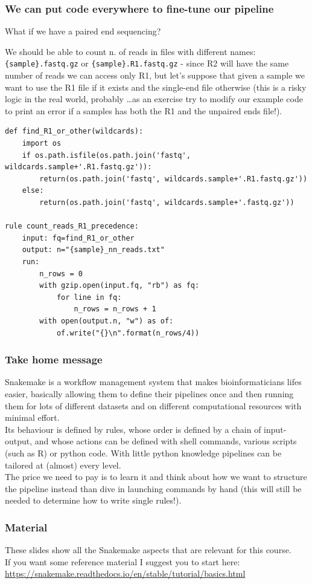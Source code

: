 \documentclass[xcolor=table]{beamer}
\begin{document}
\begin{frame}
\frametitle{We can put code everywhere to fine-tune our pipeline}
What if we have a paired end sequencing?

We should be able to count n. of reads in \textcolor{beer}{files with different names}:
\texttt{\{sample\}.fastq.gz} or \texttt{\{sample\}.R1.fastq.gz} - since R2 will have the same
number of reads we can access only R1, but let's suppose that given a sample we want to use the R1 file
if it exists and the single-end file otherwise (this is a risky logic in the real world, probably \ldots as an 
exercise try to modify our example code to print an error if a samples has both the R1 and the unpaired ends file!).

\end{frame}


\begin{frame}[fragile]
\begin{lstlisting}[basicstyle=\tiny]
def find_R1_or_other(wildcards):
    import os
    if os.path.isfile(os.path.join('fastq', wildcards.sample+'.R1.fastq.gz')):
        return(os.path.join('fastq', wildcards.sample+'.R1.fastq.gz'))
    else:
        return(os.path.join('fastq', wildcards.sample+'.fastq.gz'))

rule count_reads_R1_precedence:
    input: fq=find_R1_or_other
    output: n="{sample}_nn_reads.txt"
    run: 
        n_rows = 0
        with gzip.open(input.fq, "rb") as fq:
            for line in fq:
                n_rows = n_rows + 1
        with open(output.n, "w") as of:
            of.write("{}\n".format(n_rows/4))
\end{lstlisting}
\end{frame}


\begin{frame}
\frametitle{Take home message}
Snakemake is a workflow management system that makes bioinformaticians lifes easier, basically allowing them
to define their \textcolor{galon}{pipelines} once and then running them for lots of different datasets and on different
computational resources with minimal effort. \\
Its behaviour is defined by \textcolor{novak}{rules}, whose order is defined by a chain of input-output, and whose actions
can be defined with shell commands, various scripts (such as R) or python code. With little python knowledge pipelines can be tailored
at (almost) every level.
\\ The price we need to pay is to learn it and think about how we want to structure
the pipeline instead than dive in launching commands by hand (this will still be needed to determine how to write single rules!).
\end{frame}

\begin{frame}
\frametitle{Material}
These slides show all the Snakemake aspects that are relevant for this course. \\ If you want some reference material I suggest
you to start here: \url{https://snakemake.readthedocs.io/en/stable/tutorial/basics.html}
\end{frame}
\end{document}
